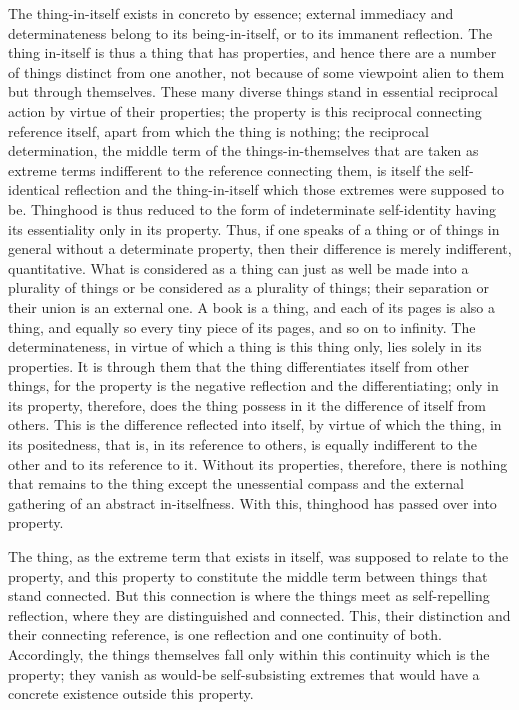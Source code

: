 The thing-in-itself exists in concreto by essence;
external immediacy and determinateness belong to its being-in-itself,
or to its immanent reflection.
The thing in-itself is thus a thing that has properties,
and hence there are a number of things distinct from one another,
not because of some viewpoint alien to them but through themselves.
These many diverse things stand in
essential reciprocal action by virtue of their properties;
the property is this reciprocal connecting reference itself,
apart from which the thing is nothing;
the reciprocal determination, the middle term of
the things-in-themselves that are taken as extreme terms
indifferent to the reference connecting them,
is itself the self-identical reflection and the thing-in-itself
which those extremes were supposed to be.
Thinghood is thus reduced to the form of
indeterminate self-identity having its essentiality only in its property.
Thus, if one speaks of a thing or of things in general
without a determinate property, then their difference is
merely indifferent, quantitative.
What is considered as a thing can just as well be made into
a plurality of things or be considered as a plurality of things;
their separation or their union is an external one.
A book is a thing, and each of its pages is also a thing,
and equally so every tiny piece of its pages,
and so on to infinity.
The determinateness, in virtue of which a thing is this thing only,
lies solely in its properties.
It is through them that the thing differentiates itself from other things,
for the property is the negative reflection and the differentiating;
only in its property, therefore, does the thing possess in it
the difference of itself from others.
This is the difference reflected into itself,
by virtue of which the thing, in its positedness,
that is, in its reference to others, is equally indifferent
to the other and to its reference to it.
Without its properties, therefore, there is nothing that remains
to the thing except the unessential compass
and the external gathering of an abstract in-itselfness.
With this, thinghood has passed over into property.

The thing, as the extreme term that exists in itself,
was supposed to relate to the property,
and this property to constitute the middle term
between things that stand connected.
But this connection is where the things meet
as self-repelling reflection,
where they are distinguished and connected.
This, their distinction and their connecting reference,
is one reflection and one continuity of both.
Accordingly, the things themselves fall only
within this continuity which is the property;
they vanish as would-be self-subsisting extremes
that would have a concrete existence outside this property.

